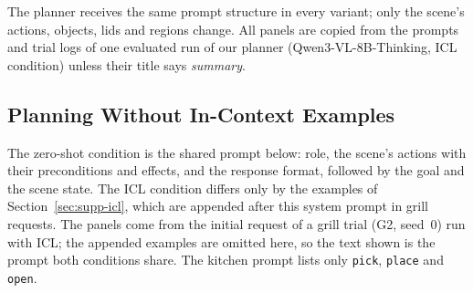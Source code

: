 \newcommand{\paneltitle}[2]{\textsc{#1}\,\textperiodcentered\,#2}

\noindent The planner receives the same prompt structure in every variant; only the scene's actions, objects,
lids and regions change. All panels are copied from the prompts and trial logs of one evaluated run of our
planner (Qwen3-VL-8B-Thinking, ICL condition) unless their title says \emph{summary}.

\subsection{Planning Without In-Context Examples}
\label{sec:supp-prompt-zs}
The zero-shot condition is the shared prompt below: role, the scene's actions with their preconditions and
effects, and the response format, followed by the goal and the scene state. The ICL condition differs only by
the examples of Section~\ref{sec:supp-icl}, which are appended after this system prompt in grill requests. The
panels come from the initial request of a grill trial (G2, seed~0) run with ICL; the appended examples are
omitted here, so the text shown is the prompt both conditions share. The kitchen prompt lists only
\texttt{pick}, \texttt{place} and \texttt{open}.

